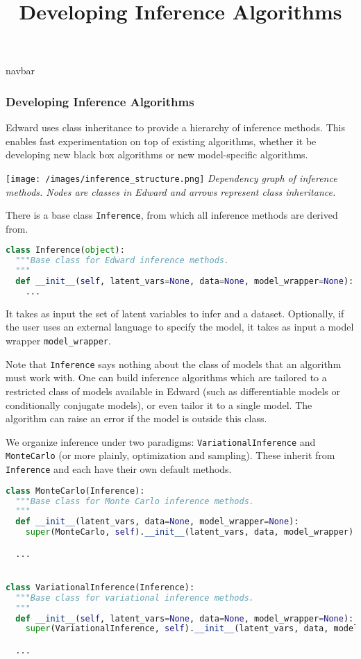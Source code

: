 \title{Developing Inference Algorithms}

{{navbar}}

\subsubsection{Developing Inference Algorithms}

Edward uses class inheritance to provide a hierarchy of inference
methods. This enables fast experimentation on top of existing
algorithms, whether it be developing new black box algorithms or
new model-specific algorithms.

\texttt{[image: /images/inference\_structure.png]}
{\small\textit{Dependency graph of inference methods.
Nodes are classes in Edward and arrows represent class inheritance.}}

There is a base class \texttt{Inference}, from which all inference
methods are derived from.

\begin{lstlisting}[language=Python]
class Inference(object):
  """Base class for Edward inference methods.
  """
  def __init__(self, latent_vars=None, data=None, model_wrapper=None):
    ...
\end{lstlisting}

It takes as input the set of latent variables to infer and a dataset. Optionally, if the user uses an external language to specify the model, it takes as input a model wrapper \texttt{model_wrapper}.

Note that \texttt{Inference} says nothing about the class of models that an
algorithm must work with. One can build inference algorithms which are
tailored to a restricted class of models available in Edward (such as
differentiable models or conditionally conjugate models), or even
tailor it to a single model. The algorithm can raise an error if the
model is outside this class.

We organize inference under two paradigms:
\texttt{VariationalInference} and \texttt{MonteCarlo} (or more plainly,
optimization and sampling). These inherit from \texttt{Inference} and each
have their own default methods.

\begin{lstlisting}[language=Python]
class MonteCarlo(Inference):
  """Base class for Monte Carlo inference methods.
  """
  def __init__(latent_vars, data=None, model_wrapper=None):
    super(MonteCarlo, self).__init__(latent_vars, data, model_wrapper)

  ...


class VariationalInference(Inference):
  """Base class for variational inference methods.
  """
  def __init__(self, latent_vars=None, data=None, model_wrapper=None):
    super(VariationalInference, self).__init__(latent_vars, data, model_wrapper)

  ...
\end{lstlisting}

